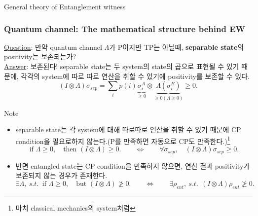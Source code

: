 \documentclass[9pt]{beamer}
\begin{document}
\begin{section}{General theory of  Entanglement witness}
        \begin{frame}
            \frametitle{Quantum channel: The mathematical structure behind EW}
            \underline{Question}: 만약 quantum channel $\Lambda$가 P이지만 TP는 아닐때, \textbf{separable state}의 positivity는 보존되는가?\\
            \underline{Answer}: 보존된다! separable state는 두 system의 state의 곱으로 표현될 수 있기 때문에, 각각의 system에 따로 따로 연산을 취할 수 있기에 positivity를 보존할 수 있다.
            \begin{equation*}
                (I\otimes \Lambda) \sigma_{sep} = \sum_i p(i) \underbrace{\sigma^A_i}_{\ge 0} \otimes \underbrace{\Lambda(\sigma_i^B)}_{\ge 0 (\Lambda \ge 0)} \ge 0.
            \end{equation*}
            \vspace{-0.2cm}
            \begin{block}{Note}
                \begin{itemize}
                    \item separable state는 각 system에 대해 따로따로 연산을 취할 수 있기 때문에 CP condition을 필요로하지 않는다.(P를 만족하면 자동으로 CP도 만족한다.)\footnote{마치 classical mechanics의 system처럼}
                    \begin{equation*}
                        \text{if } \Lambda \ge 0,\quad \text{then } (I \otimes \Lambda) \ge 0. \qquad \Leftrightarrow \qquad \forall \sigma_{sep},\quad (I\otimes \Lambda)\sigma_{sep} \ge 0.
                    \end{equation*}
                    \item 반면 entangled state는 CP condition을 만족하지 않으면, 연산 결과 positivity가 보존되지 않는 경우가 존재한다. 
                    \begin{equation*}
                        \exists \Lambda,\ s.t.\ \text{ if } \Lambda \ge 0, \quad \text{but } (I \otimes \Lambda) \not \ge 0. \qquad \Leftrightarrow \qquad \exists \rho_{ent},\ s.t.\ \ (I\otimes \Lambda) \rho_{ent} \not \ge 0.
                    \end{equation*}
                \end{itemize}
            \end{block}
        \end{frame}


\end{section}
\end{document}
